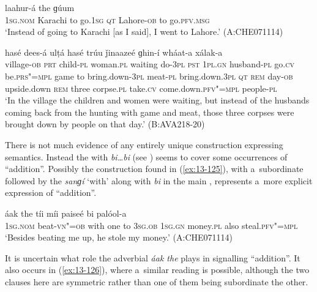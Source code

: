 \begin{exe}
\ex
\label{ex:13-123}
 laahur-á the  ɡúum \\
\textsc{1sg.nom} Karachi to go.\textsc{1sg} \textsc{qt} Lahore-\textsc{ob} to go.\textsc{pfv.msg} \\
\glt `Instead of going to Karachi [as I said], I went to Lahore.' (A:CHE071114)

\ex
\label{ex:13-124}
 hasé	dees-á ulṭá hasé trúu ǰinaazeé ɡhin-í wháat-a xálak-a \\
village-\textsc{ob} \textsc{prt} child-\textsc{pl} woman.\textsc{pl} waiting do-\textsc{3pl}
\textsc{pst} \textsc{1pl.gn} husband-\textsc{pl} go.\textsc{cv} be.\textsc{prs"=mpl} game to
bring.down-\textsc{3pl} meat-\textsc{pl} bring.down.\textsc{3pl} \textsc{qt}  \textsc{rem} day-\textsc{ob} upside.down \textsc{rem} three corpse.\textsc{pl} take.\textsc{cv} come.down.\textsc{pfv"=mpl} people-\textsc{pl} \\
\glt `In the village the children and women were waiting, but instead of the husbands coming back from the hunting with game and meat, those three corpses were brought down by people on that day.' (B:AVA218-20) 
\end{exe}

 There is not much evidence of any entirely unique construction expressing  semantics. Instead the  with \textit{bi{\ldots}bi} (see ) seems to cover some occurrences of ``addition''. Possibly the construction found in (\ref{ex:13-125}), with a~subordinate  followed by the  \textit{sanɡí} `with' along with \textit{bi} in the main , represents a~more explicit expression of ``addition''. 

\begin{exe}
\ex
\label{ex:13-125}
 áak the tíi míi  paiseé bi palóol-a \\
\textsc{1sg.nom} beat-\textsc{vn"=ob} with one to \textsc{3sg.ob} \textsc{1sg.gn} money.\textsc{pl}  also steal.\textsc{pfv"=mpl} \\
\glt `Besides beating me up, he stole my money.' (A:CHE071114) 
\end{exe}

It is uncertain what role the adverbial  \textit{áak the} plays in signalling ``addition''. It also occurs in (\ref{ex:13-126}), where a~similar reading is possible, although the two clauses here are symmetric rather than one of them being subordinate the other.

